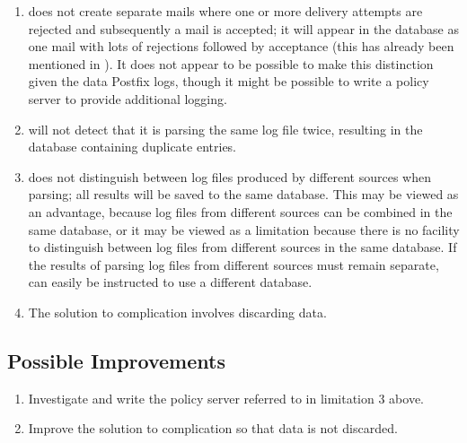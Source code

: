 \begin{enumerate}
    \item \parsername{} does not create separate mails where one or more
        delivery attempts are rejected and subsequently a mail is accepted;
        it will appear in the database as one mail with lots of rejections
        followed by acceptance (this has already been mentioned in
        ).  It does not appear to be possible
        to make this distinction given the data Postfix logs, though it
        might be possible to write a policy server to provide additional
        logging.

    \item \parsername{} will not detect that it is parsing the same log file
        twice, resulting in the database containing duplicate entries.

    \item \parsername{} does not distinguish between log files produced by
        different sources when parsing; all results will be saved to the
        same database.  This may be viewed as an advantage, because log
        files from different sources can be combined in the same database,
        or it may be viewed as a limitation because there is no facility to
        distinguish between log files from different sources in the same
        database.  If the results of parsing log files from different
        sources must remain separate, \parsername{} can easily be
        instructed to use a different database.

    \item The solution to complication  involves discarding data.

\end{enumerate}

\subsection{Possible Improvements}

\begin{enumerate}

    \item Investigate and write the policy server referred to in limitation
        3 above.

    \item Improve the solution to complication  so that data is not discarded.

\end{enumerate}


